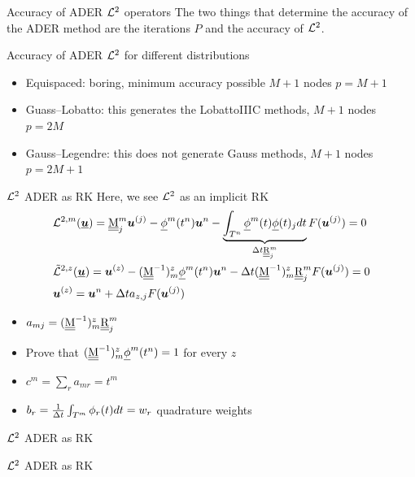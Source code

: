 \documentclass[aspectratio=169]{beamer}
\begin{document}
\begin{frame}{Accuracy of ADER $\mathcal{L}^2$ operators}
	The two things that determine the accuracy of the ADER method are the iterations $P$ and the accuracy of $\mathcal{L}^2$.

	\begin{block}{Accuracy of ADER $\mathcal{L}^2$ for different distributions}
		\begin{itemize}
			\item Equispaced: boring, minimum accuracy possible $M+1$ nodes $p=M+1$
			\item Guass--Lobatto: this generates the LobattoIIIC methods, $M+1$ nodes $p=2M$
			\item Gauss--Legendre: this does not generate Gauss methods, $M+1$ nodes $p=2M+1$ 
		\end{itemize}
		
	\end{block}

\end{frame}
\begin{frame}{$\mathcal{L}^2$ ADER as RK}
	Here, we see $\mathcal{L}^2$ as an implicit RK
	\begin{align*}
		&\mathcal{L}^{2,m}(\underline{\boldsymbol{u}}) = \underline{\underline{\mathrm{M}}}^m_j \boldsymbol{u}^{(j)} - \underline{\phi}^m(t^{n}) \boldsymbol{u}^n - \underbrace{\int_{T^n} \underline{\phi}^m(t) 
		 \underline{\phi}(t)_j dt}_{\Delta t \underline{\underline{\mathrm{R}}}_j^m}  F(\boldsymbol{u}^{(j)})=0\\
		&\tilde{\mathcal{L}}^{2,z}(\underline{\boldsymbol{u}}) =  \boldsymbol{u}^{(z)} - (\underline{\underline{\mathrm{M}}}^{-1})_m^z \underline{\phi}^m(t^{n})
		 \boldsymbol{u}^n - \Delta t (\underline{\underline{\mathrm{M}}}^{-1})_m^z\underline{\underline{\mathrm{R}}}_j^m F(\boldsymbol{u}^{(j)}) =0 \\
		 &\boldsymbol{u}^{(z)} = 
		 \boldsymbol{u}^n + \Delta t a_{z,j} F(\boldsymbol{u}^{(j)})   
	\end{align*}
	\begin{itemize}
		\item $a_{mj} = (\underline{\underline{\mathrm{M}}}^{-1})_m^z\underline{\underline{\mathrm{R}}}_j^m$
		\item Prove that  $(\underline{\underline{\mathrm{M}}}^{-1})_m^z \underline{\phi}^m(t^{n})= 1$ for every $z$
		\item $c^m= \sum_r a_{mr} = t^m$
		\item $b_r = \frac{1}{\Delta t}\int_{T^m} \phi_r(t)dt =w_r$ quadrature weights
	\end{itemize}
\end{frame}
\begin{frame}{$\mathcal{L}^2$ ADER as RK}
	
\end{frame}
\begin{frame}{$\mathcal{L}^2$ ADER as RK}
	
\end{frame}
\end{document}
